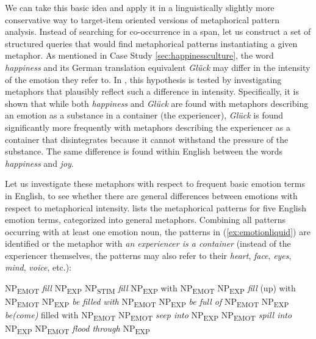 We can take this basic idea and apply it in a linguistically slightly more conservative way to target\hyp{}item oriented versions of metaphorical  pattern analysis.  Instead of searching for co\hyp{}occurrence in a span,  let us construct a set of structured queries  that would find metaphorical patterns instantiating a given metaphor. As mentioned in Case Study \ref{sec:happinessculture}, the word \textit{happiness} and its German translation equivalent \textit{Glück} may differ in the intensity of the emotion  they refer to. In \citet{stefanowitsch_happiness_2004}, this hypothesis is tested by investigating metaphors  that plausibly reflect such a difference in intensity. Specifically, it is shown that while both \textit{happiness} and \textit{Glück} are found with metaphors describing an emotion as a substance in a container (the experiencer), \textit{Glück} is found significantly more frequently with metaphors  describing the experiencer as a container that disintegrates because it cannot withstand the pressure of the substance. The same difference is found within English between the words \textit{happiness}  and \textit{joy}.

Let us investigate these metaphors  with respect to frequent basic emotion terms in English, to see whether there are general differences between emotions with respect to metaphorical intensity. \citet{stefanowitsch_words_2006} lists the metaphorical patterns for five English emotion terms, categorized  into general metaphors.  Combining all patterns occurring with at least one emotion  noun,  the patterns in (\ref{ex:emotionliquid}) are identified or the metaphor  with \textit{an experiencer is a container} (instead of the experiencer themselves, the patterns may also refer to their \textit{heart}, \textit{face}, \textit{eyes}, \textit{mind}, \textit{voice}, etc.):

\begin{exe}
\ex
\begin{xlist}
\label{ex:emotionliquid}
\ex NP\textsubscript{EMOT} \textit{fill} NP\textsubscript{EXP}
\ex NP\textsubscript{STIM} \textit{fill} NP\textsubscript{EXP} with NP\textsubscript{EMOT}
\ex NP\textsubscript{EXP} \textit{fill} (up) with NP\textsubscript{EMOT}
\ex NP\textsubscript{EXP} \textit{be filled with} NP\textsubscript{EMOT}
\ex NP\textsubscript{EXP} \textit{be full of} NP\textsubscript{EMOT}
\ex NP\textsubscript{EXP} \textit{be(come)} filled with NP\textsubscript{EMOT}
\ex NP\textsubscript{EMOT} \textit{seep into} NP\textsubscript{EXP}
\ex NP\textsubscript{EMOT} \textit{spill into} NP\textsubscript{EXP}
\ex NP\textsubscript{EMOT} \textit{flood through} NP\textsubscript{EXP}
\end{xlist}
\end{exe}

